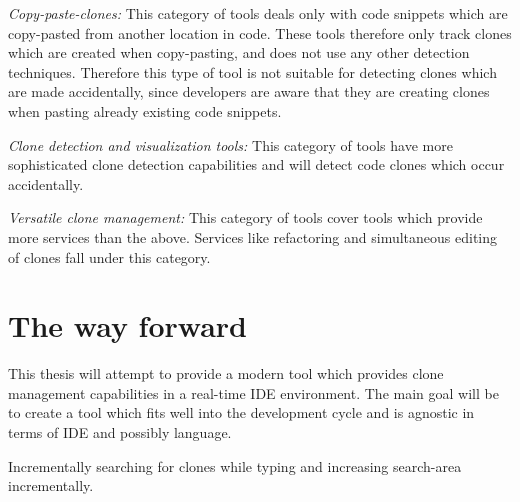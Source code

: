 \documentclass[12pt]{article}
\begin{document}
\textit{Copy-paste-clones:} This category of tools deals only with code snippets which are
copy-pasted from another location in code. These tools therefore only track clones which
are created when copy-pasting, and does not use any other detection techniques. Therefore
this type of tool is not suitable for detecting clones which are made accidentally, since
developers are aware that they are creating clones when pasting already existing code
snippets.

\textit{Clone detection and visualization tools:} This category of tools have more
sophisticated clone detection capabilities and will detect code clones which occur
accidentally.

\textit{Versatile clone management:} This category of tools cover tools which provide more
services than the above. Services like refactoring and simultaneous editing of clones fall
under this category.

\section{The way forward}

This thesis will attempt to provide a modern tool which provides clone management
capabilities in a real-time IDE environment. The main goal will be to create a tool which
fits well into the development cycle and is agnostic in terms of IDE and possibly
language. 

Incrementally searching for clones while typing and increasing search-area incrementally.



\end{document}
